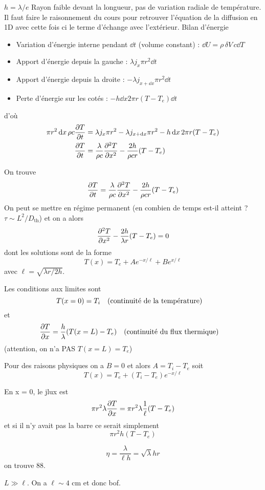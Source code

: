 \begin{solution}

\begin{questions}
    \questioncours $h = \lambda/e$
    \question Rayon faible devant la longueur, pas de variation radiale de température.
    \question Il faut faire le raisonnement du cours pour retrouver l'équation de la diffusion en 1D avec cette fois ci le terme d'échange avec l'extérieur. Bilan d'énergie
    \begin{itemize}
        \item Variation d'énergie interne pendant $\dd{t}$ (volume constant) : $\dd{U} = \rho \, \delta V \, c \dd{T}$
        \item Apport d'énergie depuis la gauche : $\lambda j_x \pi r^2 \dd{t}$
        \item Apport d'énergie depuis la droite : $-\lambda j_{x+\dd{x}}\pi r^2 \dd{t}$
        \item Perte d'énergie sur les cotés : $- h \dd{x} 2 \pi r (T-T_e) \dd{t}$
    \end{itemize}
    d'où
    \begin{align*}
    \pi r^2 \dd{x} \rho c \pdv{T}{t} &= \lambda j_x \pi r^2 - \lambda j_{x+\dd{x}}\pi r^2 - h \dd{x} 2 \pi r (T-T_e) \\
    \pdv{T}{t} &= \frac{\lambda}{\rho c} \pdv[2]{T}{x} - \frac{2h}{\rho c r}(T-T_e)
    \end{align*}
    
    \question  On trouve 
    $$\pdv{T}{t} = \frac{\lambda}{\rho c} \pdv[2]{T}{x} - \frac{2h}{\rho c r}(T-T_e)$$
    On peut se mettre en régime permanent (en combien de temps est-il atteint ? $\tau \sim L^2/D_\text{th}$) et on a alors
    $$ \pdv[2]{T}{x} - \frac{2h}{\lambda r}(T-T_e) = 0$$
    dont les solutions sont de la forme
    $$
    T(x) = T_e + A e^{-x/\ell} + B e^{x/\ell}
    $$
    avec $\ell = \sqrt{\lambda r/2h}$.
    
    Les conditions aux limites sont $$T(x = 0) = T_i \qqtext{(continuité de la température)}$$  et $$\pdv{T}{x}(x = L) = \frac{h}{\lambda}(T(x=L) - T_e) \qqtext{(continuité du flux thermique)}$$  (attention, on n'a PAS $T(x = L) = T_e$)
    
    \question Pour des raisons physiques on a $B = 0$ et alors $A = T_i - T_e$ soit $$
    T(x) = T_e + (T_i - T_e) e^{-x/\ell}
    $$
    
    \question En x = 0, le jlux est 
    $$ \pi r^2 \lambda \pdv{T}{x}(x = 0) = \pi r^2 \lambda\frac{1}{\ell} (T-T_e)$$
    et si il n'y avait pas la barre ce serait simplement 
    $$\pi r^2 h (T-T_e)$$
    
    \question $$ \eta = \frac{\lambda}{\ell h} = \sqrt{\lambda}{h r}$$
    on trouve 88.
    
    
    \question $L \gg \ell$. On a $\ell \sim 4$ cm et donc bof.
\end{questions}
\end{solution}

